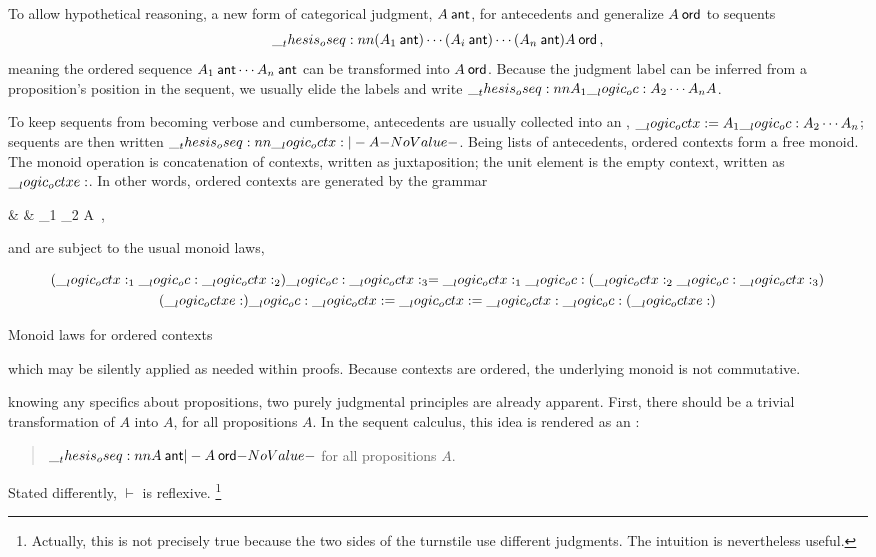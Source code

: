 To allow hypothetical reasoning, a new form of categorical judgment, $A \ant$, for antecedents and generalize $A \ord$ to sequents
  \begin{equation*}
    \oseq{(A_1 \ant) \dotsm (A_i \ant) \dotsm (A_n \ant) |- A \ord}
    \,,
  \end{equation*}
  meaning the ordered sequence $A_1 \ant \dotsm A_n \ant$ can be transformed into $A \ord$.
  Because the judgment label can be inferred from a proposition's position in the sequent, we usually elide the labels and write $\oseq{A_1 \oc A_2 \dotsm A_n |- A}$.

To keep sequents from becoming verbose and cumbersome, antecedents are usually collected into an , $\__logic_octx: = A_1 \__logic_oc: A_2 \dotsm A_n$; sequents are then written $\oseq{\octx |- A}$.
% 
Being lists of antecedents, ordered contexts form a free monoid.
The monoid operation is concatenation of contexts, written as juxtaposition; the unit element is the empty context, written as $\__logic_octxe:$.
In other words, ordered contexts are generated by the grammar
\begin{syntax*}
  & \octx & \octx_1 \oc \octx_2 \mid \octxe \mid A \ant
  \,,
\end{syntax*}
and are subject to the usual monoid laws,
\begin{marginfigure}
  \begin{gather*}
    (\__logic_octx:_1 \__logic_oc: \__logic_octx:_2) \__logic_oc: \__logic_octx:_3 = \__logic_octx:_1 \__logic_oc: (\__logic_octx:_2 \__logic_oc: \__logic_octx:_3) \\
    (\__logic_octxe:) \__logic_oc: \__logic_octx: = \__logic_octx: = \__logic_octx: \__logic_oc: (\__logic_octxe:)
  \end{gather*}
  \caption{Monoid laws for ordered contexts}
\end{marginfigure}%
which may be silently applied as needed within proofs.
Because contexts are ordered, the underlying monoid is not commutative.

 knowing any specifics about propositions, two purely judgmental principles are already apparent.
%
First, there should be a trivial transformation of $A$ into $A$, for all propositions $A$.
In the sequent calculus, this idea is rendered as an :
\begin{quotation}
  $\oseq{A \ant |- A \ord}$ for all propositions $A$.
\end{quotation}
Stated differently, $\vdash$ is reflexive.%
\footnote{Actually, this is not precisely true because the two sides of the turnstile use different judgments.
The intuition is nevertheless useful.}

